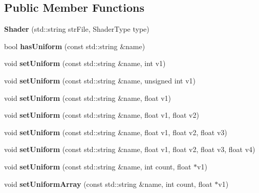 \subsection*{Public Member Functions}
\begin{DoxyCompactItemize}
\item 
{\bfseries Shader} (std\-::string str\-File, Shader\-Type type)\label{classsfs__visualizer_1_1Shader_a788625a07b6ab1a9289f7908d57fbcee}

\item 
bool {\bfseries has\-Uniform} (const std\-::string \&name)\label{classsfs__visualizer_1_1Shader_aafd1573a18131732760d145980faa29b}

\item 
void {\bfseries set\-Uniform} (const std\-::string \&name, int v1)\label{classsfs__visualizer_1_1Shader_a7c338cb2207bf8f07f01e660e66fd074}

\item 
void {\bfseries set\-Uniform} (const std\-::string \&name, unsigned int v1)\label{classsfs__visualizer_1_1Shader_a765c976862f1b7b195753203d809ee81}

\item 
void {\bfseries set\-Uniform} (const std\-::string \&name, float v1)\label{classsfs__visualizer_1_1Shader_a4a3b23dc158f7b807637d7bfe45e06df}

\item 
void {\bfseries set\-Uniform} (const std\-::string \&name, float v1, float v2)\label{classsfs__visualizer_1_1Shader_a49421168f8dde7eceb27a3b81476f9a8}

\item 
void {\bfseries set\-Uniform} (const std\-::string \&name, float v1, float v2, float v3)\label{classsfs__visualizer_1_1Shader_a28860ee636ca9be63aa01b1d26af8c73}

\item 
void {\bfseries set\-Uniform} (const std\-::string \&name, float v1, float v2, float v3, float v4)\label{classsfs__visualizer_1_1Shader_a1c5a47ed1c0b4c717a2c814ae11c1aba}

\item 
void {\bfseries set\-Uniform} (const std\-::string \&name, int count, float $\ast$v1)\label{classsfs__visualizer_1_1Shader_a86a3b0dd818a86e00ce4f65ed6f60155}

\item 
void {\bfseries set\-Uniform\-Array} (const std\-::string \&name, int count, float $\ast$v1)\label{classsfs__visualizer_1_1Shader_a7e9a6db4e87a10c28b54629beff7134a}


\end{DoxyCompactItemize}
